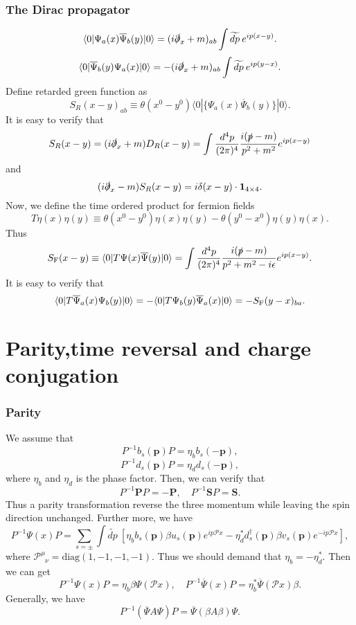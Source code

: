 \subsubsection{The Dirac propagator}
\[\langle 0 | \Psi_a(x)\overline{\Psi}_b(y)|0\rangle = (i\slashed{\partial}_x+m)_{ab} \int \widetilde{dp} \: e^{ip(x-y)}.\]
\[\langle 0 | \overline{\Psi}_b(y) \Psi_a(x)|0\rangle = -(i\slashed{\partial}_x+m)_{ab} \int \widetilde{dp} \: e^{ip(y-x)}.\]
Define retarded green function as
\[S_{R}(x-y)_{ab} \equiv \theta(x^0-y^0) \langle 0 | \{\Psi_a(x)\overline{\Psi}_b(y)\}|0\rangle.\]
It is easy to verify that
\[S_{R}(x-y) = (i\slashed{\partial}_x+m) D_R(x-y) = \int \frac{d^4p}{(2\pi)^4} \frac{i(\slashed{p}-m)}{p^2+m^2} e^{ip(x-y)}\]
and
\[(i\slashed{\partial}_x-m) S_{R}(x-y) = i\delta(x-y) \cdot \bm{1}_{4\times 4}.\]
Now, we  define  the time ordered product for fermion fields
\[T \eta(x) \eta(y) \equiv \theta(x^0-y^0)\eta(x)\eta(y) - \theta(y^0-x^0)\eta(y)\eta(x).\]
Thus
\[S_{\rm F}(x-y) \equiv \langle 0 | T \Psi(x)\overline{\Psi}(y)|0\rangle =  \int \frac{d^4p}{(2\pi)^4} \frac{i(\slashed{p}-m)}{p^2+m^2 - i\epsilon} e^{ip(x-y)}.\]
It is easy to verify that
\[\langle 0 | T \overline{\Psi}_a(x) \Psi_b(y)|0\rangle = - \langle 0 | T \Psi_b(y) \overline{\Psi}_a(x)|0\rangle = -S_{\rm F}(y-x)_{ba}.\]

\section{Parity,time reversal and charge conjugation}
\subsubsection{Parity}
\noindent
We assume that
\[P^{-1} b_s(\bm{p})P = \eta_b b_s(\bm{-p}),\]
\[P^{-1} d_s(\bm{p})P = \eta_d d_s(\bm{-p}),\]
where $\eta_b$ and $\eta_d$ is the phase factor. Then, we can verify that
\[P^{-1} \bm{P} P = -\bm{P} , \quad P^{-1} \bm{S} P =  \bm{S}.\]
Thus a parity transformation reverse the three momentum while leaving the spin direction unchanged. Further more, we have
\[P^{-1}\Psi(x)P = \sum_{s=\pm} \int \widetilde{dp} \: \left [ \eta_b b_s(\bm{p})\beta u_s(\bm{p})e^{ip\mathcal{P}x} - \eta_d^* d^{\dagger}_s(\bm{p}) \beta v_s(\bm{p})e^{-ip\mathcal{P}x} \right ],\]
where $\mathcal{P}^{\mu}_{\phantom{\mu}\nu} = \mathrm{diag}(1,-1,-1,-1)$.
Thus we should demand that $\eta_b = -\eta^*_d$. 
Then we can get
\[P^{-1}\Psi(x)P = \eta_b \beta \Psi(\mathcal{P}x) , \quad P^{-1}\overline{\Psi}(x)P = \eta^*_b  \overline{\Psi}(\mathcal{P}x)\beta .\]
Generally, we have
\[P^{-1} (\overline{\Psi} A \Psi) P = \overline{\Psi}(\beta A \beta)\Psi.\]

